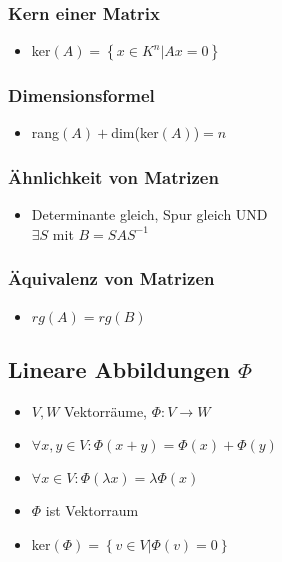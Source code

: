 \documentclass[ngerman,11pt,a4paper
,pdftex]{article}
\newcommand{\f}[1]{$#1$}
\theoremstyle{nodot}
\theoremstyle{nodot}
\begin{document}
\begin{multicols*}{3}
\begin{tcolorbox}[colback=white,bottom=10pt, top=10pt]
          \subsubsection*{Kern einer Matrix}
          \begin{itemize}
            \item ker\f{(A)=\left\{x\in K^n|Ax=0\right\} }
          \end{itemize}
          \subsubsection*{Dimensionsformel}
          \begin{itemize}
            \item rang\f{(A)+}dim(ker\f{(A)})\f{=n}
          \end{itemize}
          \subsubsection*{Ähnlichkeit von Matrizen}
          \begin{itemize}
            \item Determinante gleich, Spur gleich UND\\
            \f{\exists S} mit \f{B=SAS^{-1}}
          \end{itemize}
          \subsubsection*{Äquivalenz von Matrizen}
          \begin{itemize}
            \item \f{rg(A)=rg(B)}
          \end{itemize}
        \end{tcolorbox}

        \begin{tcolorbox}[colback=white,bottom=10pt, top=10pt]
          \subsection*{Lineare Abbildungen \f{\Phi}}
          \begin{itemize}
          \item \f{V, W} Vektorräume, \f{\Phi:V \rightarrow W}
          \item \f{\forall x,y\in V: \Phi(x+y)=\Phi(x)+\Phi(y)}
          \item \f{\forall x\in V: \Phi(\lambda x)=\lambda \Phi(x)}
          \item \f{\Phi} ist Vektorraum
          \item ker\f{(\Phi) = \left\{v\in V |\Phi(v)=0\right\} }
          \end{itemize}
        \end{tcolorbox}


\end{multicols*}
\end{document}
